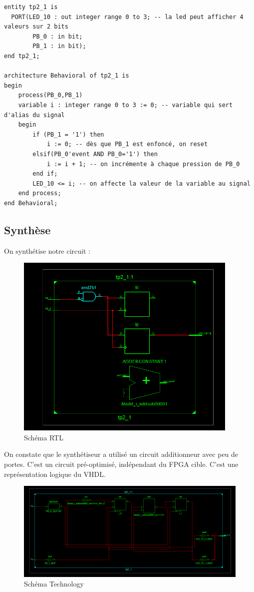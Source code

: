 \vhdl
\begin{lstlisting}
entity tp2_1 is
  PORT(LED_10 : out integer range 0 to 3; -- la led peut afficher 4 valeurs sur 2 bits
        PB_0 : in bit;
        PB_1 : in bit); 
end tp2_1;

architecture Behavioral of tp2_1 is
begin
	process(PB_0,PB_1)
	variable i : integer range 0 to 3 := 0; -- variable qui sert d'alias du signal
	begin
		if (PB_1 = '1') then
			i := 0; -- dès que PB_1 est enfoncé, on reset
		elsif(PB_0'event AND PB_0='1') then
			i := i + 1; -- on incrémente à chaque pression de PB_0
		end if;
		LED_10 <= i; -- on affecte la valeur de la variable au signal
	end process;
end Behavioral;
\end{lstlisting}

\subsection{Synthèse}

\noindent On synthétise notre circuit :
\begin{figure}[!h]
   \centering\includegraphics[width=0.95\textwidth]{files/tp2_1/RTL.png}
   \caption{Schéma \og RTL\fg{}}
\end{figure}

On constate que le synthétiseur a utilisé un circuit additionneur avec peu de portes. C'est un circuit \og pré-optimisé\fg{}, indépendant du FPGA cible. C'est une représentation logique du VHDL.

\begin{figure}[!h]
   \centering\includegraphics[width=\textwidth]{files/tp2_1/Tech.png}
   \caption{Schéma \og Technology\fg{}}
\end{figure}

